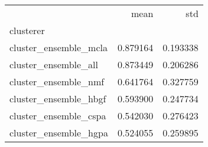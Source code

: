 \begin{tabular}{lrr}
\toprule
{} &      mean &       std \\
clusterer             &           &           \\
\midrule
cluster\_ensemble\_mcla &  0.879164 &  0.193338 \\
cluster\_ensemble\_all  &  0.873449 &  0.206286 \\
cluster\_ensemble\_nmf  &  0.641764 &  0.327759 \\
cluster\_ensemble\_hbgf &  0.593900 &  0.247734 \\
cluster\_ensemble\_cspa &  0.542030 &  0.276423 \\
cluster\_ensemble\_hgpa &  0.524055 &  0.259895 \\
\bottomrule
\end{tabular}

